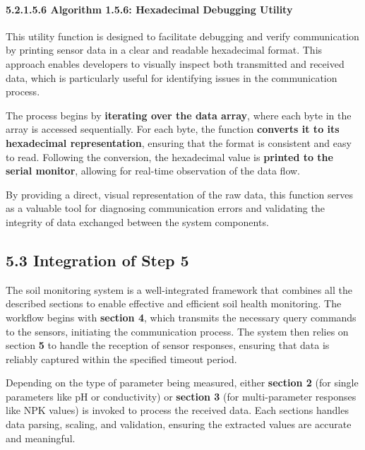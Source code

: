 \documentclass{book} %
\begin{document}
\noindent 

\noindent 
\paragraph{5.2.1.5.6 Algorithm 1.5.6: Hexadecimal Debugging Utility}

\noindent This utility function is designed to facilitate debugging and verify communication by printing sensor data in a clear and readable hexadecimal format. This approach enables developers to visually inspect both transmitted and received data, which is particularly useful for identifying issues in the communication process.

\noindent The process begins by \textbf{iterating over the data array}, where each byte in the array is accessed sequentially. For each byte, the function \textbf{converts it to its hexadecimal representation}, ensuring that the format is consistent and easy to read. Following the conversion, the hexadecimal value is \textbf{printed to the serial monitor}, allowing for real-time observation of the data flow.

\noindent By providing a direct, visual representation of the raw data, this function serves as a valuable tool for diagnosing communication errors and validating the integrity of data exchanged between the system components.

\noindent 

\noindent 
\subsection{5.3 Integration of Step 5}

\noindent The soil monitoring system is a well-integrated framework that combines all the described sections to enable effective and efficient soil health monitoring. The workflow begins with \textbf{section 4}, which transmits the necessary query commands to the sensors, initiating the communication process. The system then relies on section \textbf{5} to handle the reception of sensor responses, ensuring that data is reliably captured within the specified timeout period.

\noindent Depending on the type of parameter being measured, either \textbf{section 2} (for single parameters like pH or conductivity) or \textbf{section 3} (for multi-parameter responses like NPK values) is invoked to process the received data. Each sections handles data parsing, scaling, and validation, ensuring the extracted values are accurate and meaningful.
\end{document}
